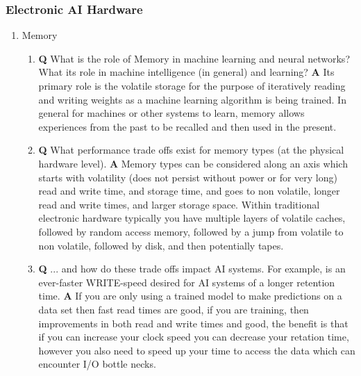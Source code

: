 \documentclass[main.tex]{subfiles}
\begin{document}
\subsubsection{Electronic AI Hardware}
\begin{enumerate}
\item Memory
    \begin{enumerate}
    \item \textbf{Q} What is the role of Memory in machine learning and neural networks? What its role in machine intelligence (in general) and learning? \textbf{A} Its primary role is the volatile storage for the purpose of iteratively reading and writing weights as a machine learning algorithm is being trained. In general for machines or other systems to learn, memory allows experiences from the past to be recalled and then used in the present.
    \item \textbf{Q} What performance trade offs exist for memory types (at the physical hardware level). \textbf{A} Memory types can be considered along an axis which starts with volatility (does not persist without power or for very long) read and write time, and storage time, and goes to non volatile, longer read and write times, and larger storage space. Within traditional electronic hardware typically you have multiple layers of volatile caches, followed by random access memory, followed by a jump from volatile to non volatile, followed by disk, and then potentially tapes.
    \item \textbf{Q} ... and how do these trade offs impact AI systems. For example, is an ever-faster WRITE-speed desired for AI systems of a longer retention time. \textbf{A} If you are only using a trained model to make predictions on a data set then fast read times are good, if you are training, then improvements in both read and write times and good, the benefit is that if you can increase your clock speed you can decrease your retation time, however you also need to speed up your time to access the data which can encounter I/O bottle necks.
    \end{enumerate}


\end{enumerate}
\end{document}
